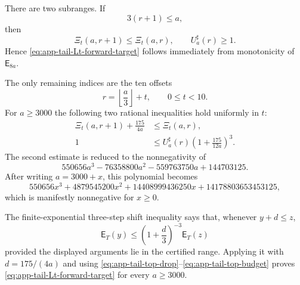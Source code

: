 \documentclass[11pt]{article}
\theoremstyle{definition}
\theoremstyle{remark}
\newcommand{\PE}{\mathsf E}
\newcommand{\floor}[1]{\left\lfloor #1\right\rfloor}
\begin{document}
There are two subranges.  If
\begin{equation}\label{eq:app-tail-front-range}
 3(r+1)\le a,
\end{equation}
then
\begin{equation}\label{eq:app-tail-Et-front-mono}
 \Xi_t(a,r+1)\le \Xi_t(a,r),
 \qquad U^{\sharp}_a(r)\ge1.
\end{equation}
Hence \eqref{eq:app-tail-Lt-forward-target} follows immediately from
monotonicity of $\PE_{8a}$.

The only remaining indices are the ten offsets
\begin{equation}\label{eq:app-tail-top-offset}
 r=\floor{\frac a3}+t,
 \qquad 0\le t<10.
\end{equation}
For $a\ge3000$ the following two rational inequalities hold uniformly in
$t$:
\begin{align}
 \Xi_t(a,r+1)+\frac{175}{4a}&\le \Xi_t(a,r),
 \label{eq:app-tail-top-drop}\\
 1&\le U^{\sharp}_a(r)\left(1+\frac{175}{12a}\right)^3.
 \label{eq:app-tail-top-budget}
\end{align}
The second estimate is reduced to the nonnegativity of
\begin{equation}\label{eq:app-tail-top-poly}
 550656a^3-76358800a^2-559763750a+144703125.
\end{equation}
After writing $a=3000+x$, this polynomial becomes
\begin{equation}\label{eq:app-tail-top-poly-shift}
 550656x^3+4879545200x^2
 +14408999436250x+14178803653453125,
\end{equation}
which is manifestly nonnegative for $x\ge0$.

The finite-exponential three-step shift inequality says that, whenever
$y+d\le z$,
\begin{equation}\label{eq:app-tail-three-step}
 \PE_T(y)\le
 \left(1+\frac d3\right)^{-3}\PE_T(z)
\end{equation}
provided the displayed arguments lie in the certified range.  Applying it
with $d=175/(4a)$ and using
\eqref{eq:app-tail-top-drop}--\eqref{eq:app-tail-top-budget} proves
\eqref{eq:app-tail-Lt-forward-target} for every $a\ge3000$.
\end{document}
